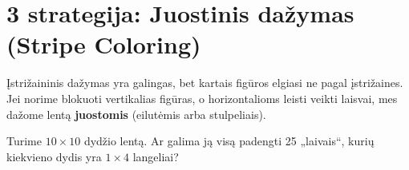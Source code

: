 \documentclass[11pt,a4paper]{scrartcl}
\begin{document}
\section{3 strategija: Juostinis dažymas (Stripe Coloring)}

Įstrižaininis dažymas yra galingas, bet kartais figūros elgiasi ne pagal įstrižaines. Jei norime blokuoti vertikalias figūras, o horizontalioms leisti veikti laisvai, mes dažome lentą \textbf{juostomis} (eilutėmis arba stulpeliais).

\begin{example}
Turime $10 \times 10$ dydžio lentą. Ar galima ją visą padengti 25 „laivais“, kurių kiekvieno dydis yra $1 \times 4$ langeliai?
\end{example}
\end{document}
